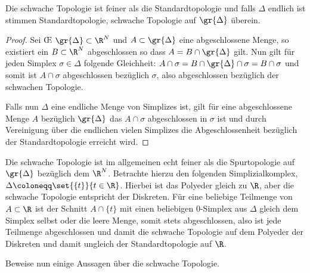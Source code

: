 \begin{Lem}
  Die schwache Topologie ist feiner als die Standardtopologie und
  falls $\Delta$ endlich ist stimmen Standardtopologie, schwache
  Topologie auf $\gr{\Delta}$ überein.
  \begin{proof}
    Sei \OE\; $\gr{\Delta} \subset \R^N$ und $A \subset \gr{\Delta}$
    eine abgeschlossene Menge, so existiert ein $B \subset \R^N$
    abgeschlossen so dass $A = B \cap \gr{\Delta}$ gilt. Nun gilt für
    jeden Simplex $\sigma \in \Delta$ folgende Gleichheit:
    $A \cap \sigma = B \cap \gr{\Delta} \cap \sigma = B \cap \sigma$
    und somit ist $A \cap \sigma$ abgeschlossen bezüglich $\sigma$,
    also abgeschlossen bezüglich der schwachen Topologie.
		
    Falls nun $\Delta$ eine endliche Menge von Simplizes ist, gilt für
    eine abgeschlossene Menge $A$ bezüglich $\gr{\Delta}$ das
    $A \cap \sigma$ abgeschlossen in $\sigma$ ist und durch
    Vereinigung über die endlichen vielen Simplizes die
    Abgeschlossenheit bezüglich der Standardtopologie erreicht wird.
  \end{proof}
\end{Lem}

\begin{Bem}
  Die schwache Topologie ist im allgemeinen echt feiner als die
  Spurtopologie auf $\gr{\Delta}$ bezüglich dem $\R^N$. Betrachte
  hierzu den folgenden Simplizialkomplex,
  $\Delta \coloneqq \set{ \{t\} }{t \in \R}$.  Hierbei ist das Polyeder
  gleich zu $\R$, aber die schwache Topologie entspricht der
  Diskreten. Für eine beliebige Teilmenge von $A \subset \R$ ist der
  Schnitt $A \cap \{ t \}$ mit einen beliebigen $0$-Simplex aus
  $\Delta$ gleich dem Simplex selbst oder die leere Menge, somit stets
  abgeschlossen, also ist jede Teilmenge abgeschlossen und damit die
  schwache Topologie auf dem Polyeder der Diskreten und damit ungleich
  der Standardtopologie auf $\R$.
\end{Bem}

Beweise nun einige Aussagen über die schwache Topologie.

